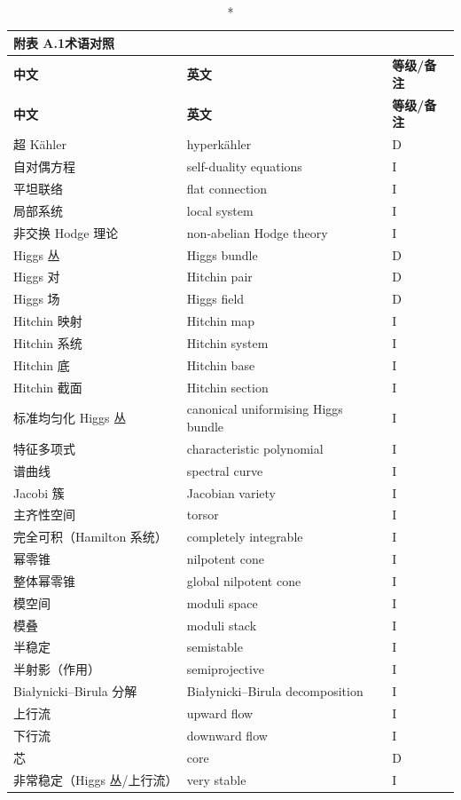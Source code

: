 \renewcommand{\arraystretch}{1.18}
\begin{longtable}{@{}p{5.4cm}p{6.3cm}p{2.2cm}@{}}
\caption*{\textbf{附表 A.1}\quad 术语对照}\\
\toprule
\textbf{中文} & \textbf{英文} & \textbf{等级/备注}\\
\midrule
\endfirsthead
\toprule
\textbf{中文} & \textbf{英文} & \textbf{等级/备注}\\
\midrule
\endhead
\bottomrule
\endfoot
超 Kähler & hyperkähler & D\\
自对偶方程 & self-duality equations & I\\
平坦联络 & flat connection & I\\
局部系统 & local system & I\\
非交换 Hodge 理论 & non-abelian Hodge theory & I\\
Higgs 丛 & Higgs bundle & D\\
Higgs 对 & Hitchin pair & D\\
Higgs 场 & Higgs field & D\\
Hitchin 映射 & Hitchin map & I\\
Hitchin 系统 & Hitchin system & I\\
Hitchin 底 & Hitchin base & I\\
Hitchin 截面 & Hitchin section & I\\
标准均匀化 Higgs 丛 & canonical uniformising Higgs bundle & I\\
特征多项式 & characteristic polynomial & I\\
谱曲线 & spectral curve & I\\
Jacobi 簇 & Jacobian variety & I\\
主齐性空间 & torsor & I\\
完全可积（Hamilton 系统） & completely integrable & I\\
幂零锥 & nilpotent cone & I\\
整体幂零锥 & global nilpotent cone & I\\
模空间 & moduli space & I\\
模叠 & moduli stack & I\\
半稳定 & semistable & I\\
半射影（作用） & semiprojective & I\\
Białynicki--Birula 分解 & Białynicki--Birula decomposition & I\\
上行流 & upward flow & I\\
下行流 & downward flow & I\\
芯 & core & D\\
非常稳定（Higgs 丛/上行流） & very stable & I\\

\end{longtable}
